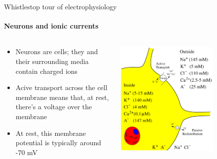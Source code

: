 \documentclass[aspectratio=169]{beamer}
\begin{document}
\begin{frame}[label={sec:org1d321ec}]{Whistlestop tour of electrophysiology}
\framesubtitle{Neurons and ionic currents}

\begin{columns}
\begin{column}{0.6\columnwidth}
\begin{itemize}
\item Neurons are cells; they and their surrounding media contain charged ions
\item Acive transport across the cell membrane means that, at rest, there's a voltage over the membrane
\item At rest, this membrane potential is typically around -70 mV
\end{itemize}
\end{column}

\begin{column}{0.4\columnwidth}
\begin{center}
\includegraphics[width=0.7\textwidth]{./neuron_diagram.png}
\end{center}
\end{column}
\end{columns}
\end{frame}
\end{document}
